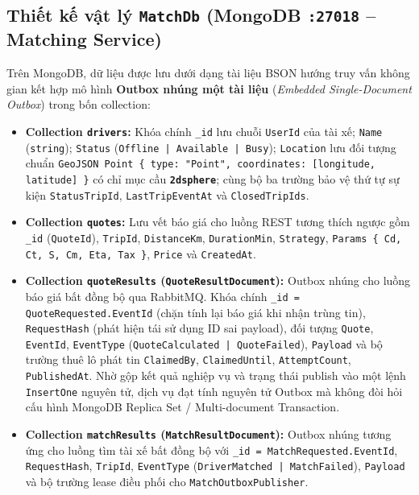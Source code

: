 \documentclass[12pt,a4paper]{article}
\begin{document}
\subsection{Thiết kế vật lý \texttt{MatchDb} (MongoDB \texttt{:27018} -- Matching Service)}
Trên MongoDB, dữ liệu được lưu dưới dạng tài liệu BSON hướng truy vấn không gian kết hợp mô hình \textbf{Outbox nhúng một tài liệu} (\textit{Embedded Single-Document Outbox}) trong bốn collection:
\begin{itemize}[nosep]
    \item \textbf{Collection \texttt{drivers}:} Khóa chính \texttt{\_id} lưu chuỗi \texttt{UserId} của tài xế; \texttt{Name} (\texttt{string}); \texttt{Status} (\texttt{Offline | Available | Busy}); \texttt{Location} lưu đối tượng chuẩn \texttt{GeoJSON Point \{ type: "Point", coordinates: [longitude, latitude] \}} có chỉ mục cầu \textbf{\texttt{2dsphere}}; cùng bộ ba trường bảo vệ thứ tự sự kiện \texttt{StatusTripId}, \texttt{LastTripEventAt} và \texttt{ClosedTripIds}.
    \item \textbf{Collection \texttt{quotes}:} Lưu vết báo giá cho luồng REST tương thích ngược gồm \texttt{\_id} (\texttt{QuoteId}), \texttt{TripId}, \texttt{DistanceKm}, \texttt{DurationMin}, \texttt{Strategy}, \texttt{Params \{ Cd, Ct, S, Cm, Eta, Tax \}}, \texttt{Price} và \texttt{CreatedAt}.
    \item \textbf{Collection \texttt{quoteResults} (\texttt{QuoteResultDocument}):} Outbox nhúng cho luồng báo giá bất đồng bộ qua RabbitMQ. Khóa chính \texttt{\_id = QuoteRequested.EventId} (chặn tính lại báo giá khi nhận trùng tin), \texttt{RequestHash} (phát hiện tái sử dụng ID sai payload), đối tượng \texttt{Quote}, \texttt{EventId}, \texttt{EventType} (\texttt{QuoteCalculated | QuoteFailed}), \texttt{Payload} và bộ trường thuê lô phát tin \texttt{ClaimedBy}, \texttt{ClaimedUntil}, \texttt{AttemptCount}, \texttt{PublishedAt}. Nhờ gộp kết quả nghiệp vụ và trạng thái publish vào một lệnh \texttt{InsertOne} nguyên tử, dịch vụ đạt tính nguyên tử Outbox mà không đòi hỏi cấu hình MongoDB Replica Set / Multi-document Transaction.
    \item \textbf{Collection \texttt{matchResults} (\texttt{MatchResultDocument}):} Outbox nhúng tương ứng cho luồng tìm tài xế bất đồng bộ với \texttt{\_id = MatchRequested.EventId}, \texttt{RequestHash}, \texttt{TripId}, \texttt{EventType} (\texttt{DriverMatched | MatchFailed}), \texttt{Payload} và bộ trường lease điều phối cho \texttt{MatchOutboxPublisher}.
\end{itemize}
\end{document}
